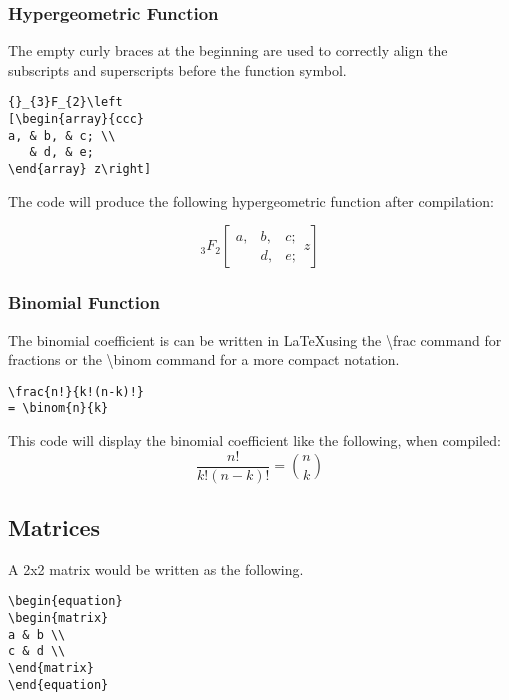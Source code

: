 \documentclass[12pt,journal,compsoc]{IEEEtran}
\begin{document}
\subsubsection{Hypergeometric Function}
The empty curly braces at the beginning are used to correctly align the subscripts and superscripts before the function symbol.

\begin{verbatim}
{}_{3}F_{2}\left
[\begin{array}{ccc}
a, & b, & c; \\
   & d, & e; 
\end{array} z\right]
\end{verbatim}

The code will produce the following hypergeometric function after compilation:

\begin{equation}
{}_{3}F_{2}\left[
\begin{array}{ccc}
a, & b, & c; \\
   & d, & e; 
\end{array} z\right]
\end{equation}

\subsubsection{Binomial Function}
The binomial coefficient is can be written in \LaTeX using the \textbackslash frac command for fractions or the \textbackslash binom command for a more compact notation.  

\begin{verbatim}
\frac{n!}{k!(n-k)!} 
= \binom{n}{k}
\end{verbatim}

This code will display the binomial coefficient like the following, when compiled:
\begin{equation}
\frac{n!}{k!(n-k)!} = \binom{n}{k}
\end{equation}

\subsection{Matrices}
A 2x2 matrix would be written as the following. 

\begin{verbatim}
\begin{equation}
\begin{matrix}
a & b \\
c & d \\
\end{matrix}
\end{equation}
\end{verbatim}
\end{document}
